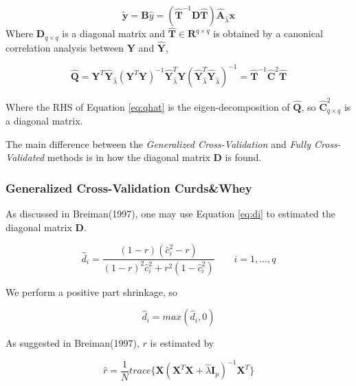 \documentclass[a4paper]{article}
\begin{document}
\begin{equation}
\tilde{\mathbf{y}} = \mathbf{B}\hat{y} = (\mathbf{\hat{T}}^{-1}\mathbf{D}\mathbf{\hat{T}})\mathbf{\hat{A}}_{\hat{\lambda}}\mathbf{x}
\end{equation}
 Where $\mathbf{D}_{q \times q}$ is a diagonal matrix and $\mathbf{\hat{T}} \in \mathbf{R}^{q \times q}$ is obtained by a canonical correlation analysis between $\mathbf{Y}$ and $\mathbf{\hat{Y}}$,
 
 \begin{equation}
 \label{eq:qhat}
\mathbf{\hat{Q}} = \mathbf{Y}^T\hat{\mathbf{Y}}_{\hat{\lambda}}(\mathbf{Y}^T\mathbf{Y})^{-1}\hat{\mathbf{Y}}_{\hat{\lambda}}^T\mathbf{Y}(\hat{\mathbf{Y}}_{\hat{\lambda}}^T\hat{\mathbf{Y}}_{\hat{\lambda}})^{-1} = \hat{\mathbf{T}}^{-1}\hat{\mathbf{C}}^2\hat{\mathbf{T}}
\end{equation}

Where the RHS of Equation \ref{eq:qhat} is the eigen-decomposition of $\hat{\mathbf{Q}}$, so  $\hat{\mathbf{C}}^2_{q \times q}$ is a diagonal matrix. 

The main difference between the \textit{Generalized Cross-Validation} and \textit{Fully Cross-Validated} methods is in how the diagonal matrix $\mathbf{D}$ is found. 

\subsubsection{Generalized Cross-Validation Curds\&Whey}
As discussed in Breiman(1997)\cite{breiman}, one may use Equation \ref{eq:di} to estimated the diagonal matrix $\mathbf{D}$. 

\begin{equation}
\label{eq:di}
\hat{d}_i = \frac{(1- r)(\hat{c}_i^2 - r)}{(1 - r)^2\hat{c}_i^2 + r^2(1 - \hat{c}_i^2)} \qquad i = 1, ..., q
\end{equation}

We perform a positive part shrinkage, so

\begin{equation}
\hat{d}_i = max(\hat{d}_i, 0)
\end{equation}

As suggested in Breiman(1997)\cite{breiman}, $r$ is estimated by

\begin{equation}
\hat{r} = \frac{1}{N} trace\{ \mathbf{X}(\mathbf{X}^T \mathbf{X} + \hat{\lambda} \mathbf{I}_p)^{-1}  \mathbf{X}^T \}
\end{equation}
\end{document}
